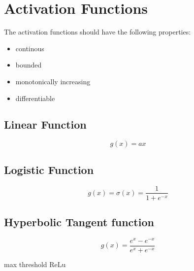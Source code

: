 \section{Activation Functions}
\label{sect:activation-functions}
The activation functions should have the following properties:
\begin{itemize}
	\item continous
	\item bounded
	\item monotonically increasing
	\item differentiable
\end{itemize}

\subsection{Linear Function}
\label{ssect:linear-function}
\[
g(x) = ax
\]

\subsection{Logistic Function}
\label{ssect:logistic-function}
\[
g(x) = \sigma(x) = \frac{1}{1 + e^{-x}}
\]

\subsection{Hyperbolic Tangent function}
\label{ssect:hyperbolic-tangent-function}
\[
g(x) = \frac{e^x - e^{-x}}{e^x + e^{-x}}
\]

max threshold
ReLu

\newpage